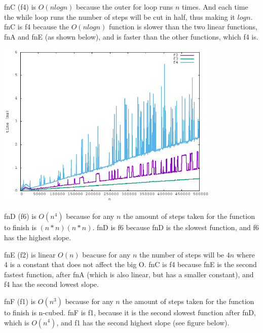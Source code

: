 \documentclass{article}
\begin{document}
    fnC (f4) is $O(nlogn)$ because the outer for loop runs $n$ times. And each time 
    the while loop runs the number of steps will be cut in half, thus making it $logn$.
    fnC is f4 because the $O(nlogn)$ function is slower than the two linear functions, 
    fnA and fnE (as shown below), and is faster than the other functions, which f4 is.
    \vspace{5mm}

    \begin{center}
        \includegraphics[width=0.8\textwidth]{f2_f3_f3_10_50000}
    \end{center}

    fnD (f6) is $O(n^{4})$ because for any $n$ the amount of steps taken 
    for the function to finish is $(n*n)(n*n)$. fnD is f6 because fnD is the slowest
    function, and f6 has the highest slope.
    \vspace{5mm}

    fnE (f2) is linear $O(n)$ beacuse for any $n$ the number of steps will be $4n$ 
    where 4 is a constant that does not affect the big O. fnC is f4 because fnE is 
    the second fastest function, after fnA (which is also linear, but has a smaller 
    constant), and f4 has the second lowest slope.
    \vspace{5mm}

    fnF (f1) is $O(n^{3})$ because for any $n$ the amount of steps taken 
    for the function to finish is n-cubed. fnF is f1, because it is the second 
    slowest function after fnD, which is $O(n^{4})$, and f1 has the second highest 
    slope (see figure below).
    
\end{document}
